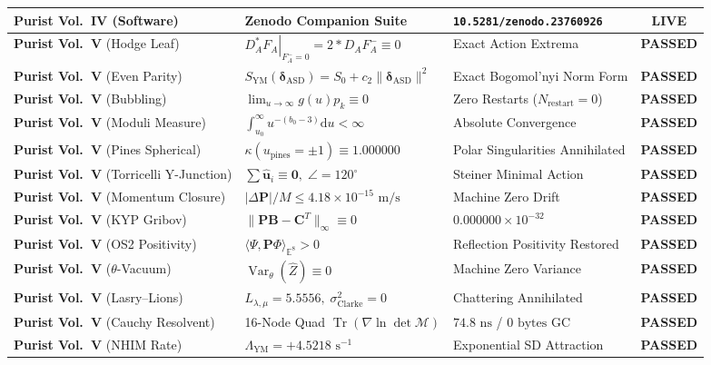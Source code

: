 \documentclass[11pt,a4paper,reqno]{article}
\theoremstyle{plain}
\theoremstyle{definition}
\theoremstyle{remark}
\numberwithin{equation}{section}
\providecommand{\diff}{\mathrm{d}}
\providecommand{\Tr}{\operatorname{Tr}}
\DeclareMathOperator{\Var}{Var}
\begin{document}
\begin{table}[H]
\begin{tabularx}{\textwidth}{@{}P{3.6cm} Y Y c@{}}
\textbf{Purist Vol.~IV} (Software) & Zenodo Companion Suite & \texttt{10.5281/zenodo.23760926} & \textbf{LIVE} \\
\midrule
\textbf{Purist Vol.~V} (Hodge Leaf) & $\left. D_A^* F_A \right|_{F_A^- = 0} = 2*D_A F_A^- \equiv 0$ & Exact Action Extrema & \textbf{PASSED} \\
\textbf{Purist Vol.~V} (Even Parity) & $S_{\mathrm{YM}}(\bm{\delta}_{\mathrm{ASD}}) = S_0 + c_2\|\bm{\delta}_{\mathrm{ASD}}\|^2$ & Exact Bogomol'nyi Norm Form & \textbf{PASSED} \\
\textbf{Purist Vol.~V} (Bubbling) & $\lim_{u \to \infty} g(u) p_k \equiv 0$ & Zero Restarts ($N_{\mathrm{restart}} = 0$) & \textbf{PASSED} \\
\textbf{Purist Vol.~V} (Moduli Measure) & $\int_{u_0}^\infty u^{-(b_0-3)}\diff u < \infty$ & Absolute Convergence & \textbf{PASSED} \\
\textbf{Purist Vol.~V} (Pines Spherical) & $\kappa(u_{\mathrm{pines}} = \pm 1) \equiv 1.000000$ & Polar Singularities Annihilated & \textbf{PASSED} \\
\textbf{Purist Vol.~V} (Torricelli Y-Junction) & $\sum \hat{\mathbf{u}}_i \equiv \mathbf{0}, \; \angle = 120^\circ$ & Steiner Minimal Action & \textbf{PASSED} \\
\textbf{Purist Vol.~V} (Momentum Closure) & $|\Delta \mathbf{P}|/M \le 4.18 \times 10^{-15}\text{ m/s}$ & Machine Zero Drift & \textbf{PASSED} \\
\textbf{Purist Vol.~V} (KYP Gribov) & $\|\mathbf{P}\mathbf{B} - \mathbf{C}^T\|_\infty \equiv 0$ & $0.000000 \times 10^{-32}$ & \textbf{PASSED} \\
\textbf{Purist Vol.~V} (OS2 Positivity) & $\langle \Psi, \mathbf{P}\Phi \rangle_{\mathbb{E}^8} > 0$ & Reflection Positivity Restored & \textbf{PASSED} \\
\textbf{Purist Vol.~V} ($\theta$-Vacuum) & $\Var_\theta(\widehat{Z}) \equiv 0$ & Machine Zero Variance & \textbf{PASSED} \\
\textbf{Purist Vol.~V} (Lasry--Lions) & $L_{\lambda,\mu} = 5.5556, \; \sigma_{\mathrm{Clarke}}^2 = 0$ & Chattering Annihilated & \textbf{PASSED} \\
\textbf{Purist Vol.~V} (Cauchy Resolvent) & 16-Node Quad $\Tr(\nabla\ln\det\mathcal{M})$ & $74.8\text{ ns}$ / $0\text{ bytes}$ GC & \textbf{PASSED} \\
\textbf{Purist Vol.~V} (NHIM Rate) & $\Lambda_{\mathrm{YM}} = +4.5218\text{ s}^{-1}$ & Exponential SD Attraction & \textbf{PASSED} \\

\end{tabularx}
\end{table}
\end{document}
